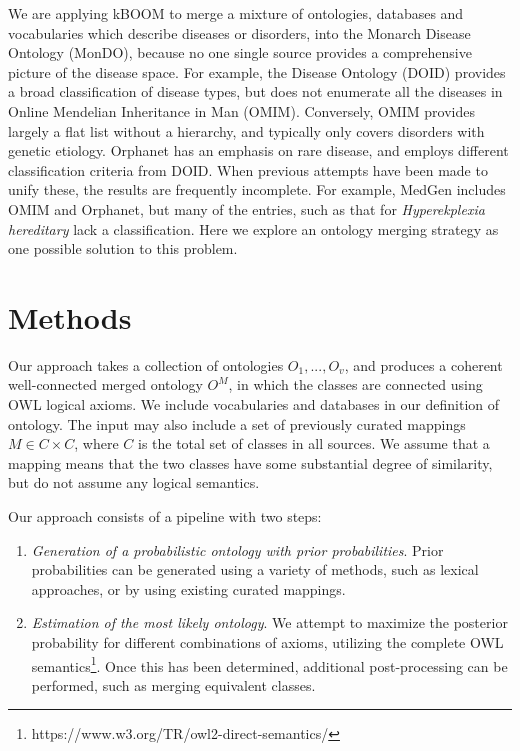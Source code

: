 \documentclass{my}
\begin{document}
We are applying kBOOM to merge a mixture of ontologies, databases and
vocabularies which describe diseases or disorders, into the Monarch
Disease Ontology (MonDO), because no one single
source provides a comprehensive picture of the disease space. For
example, the Disease Ontology (DOID)\cite{Kibbe2014} provides a broad
classification of disease types, but does not enumerate all the
diseases in Online Mendelian Inheritance in Man
(OMIM)\cite{amberger2015}. Conversely, OMIM provides largely a flat
list without a hierarchy, and typically only covers disorders with genetic
etiology. Orphanet\cite{rath2012} has an emphasis on rare disease, and
employs different classification criteria from DOID. When previous
attempts have been made to unify these, the results are frequently
incomplete. For example, MedGen\cite{coordinators2015database} includes OMIM and Orphanet, but many
of the entries, such as that for \emph{Hyperekplexia hereditary} lack
a classification. Here we explore an ontology merging strategy as one possible solution to this problem.

\section{Methods}

Our approach takes a collection of ontologies $O_1,...,O_v$, and
produces a coherent well-connected merged ontology $O^M$, in which the
classes are connected using OWL logical axioms. We include
vocabularies and databases in our definition of ontology. The input
may also include a set of previously curated mappings $M \in C \times
C$, where $C$ is the total set of classes in all sources. We assume
that a mapping means that the two classes have some substantial degree
of similarity, but do not assume any logical semantics.

Our approach consists of a pipeline with two steps:

\begin{enumerate}
\item \emph{Generation of a probabilistic ontology with prior probabilities}. Prior probabilities can be generated using a variety of methods, such as lexical approaches, or by using existing curated mappings.
\item \emph{Estimation of the most likely ontology}. We attempt to maximize the posterior probability for different combinations of axioms, utilizing the complete OWL semantics\footnote{https://www.w3.org/TR/owl2-direct-semantics/}. Once this has been determined, additional post-processing can be performed, such as merging equivalent classes.
\end{enumerate}
\end{document}
